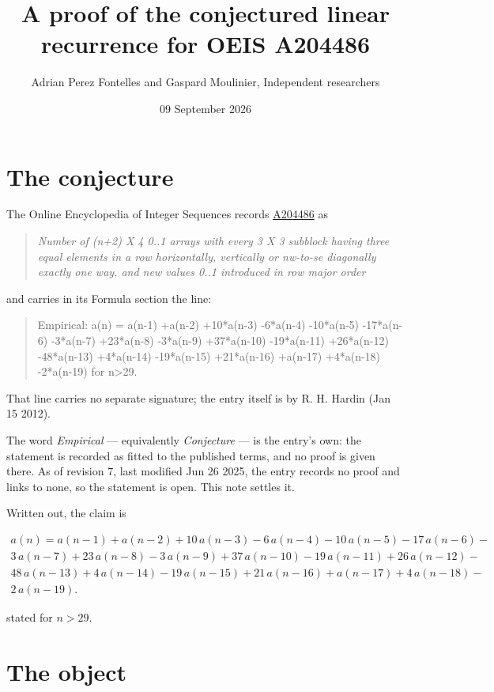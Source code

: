 \documentclass[11pt]{article}
\title{A proof of the conjectured linear recurrence for OEIS A204486}
\author{Adrian Perez Fontelles and Gaspard Moulinier, Independent researchers}
\date{09 September 2026}
\theoremstyle{definition}
\begin{document}
\maketitle
\section{The conjecture}

The Online Encyclopedia of Integer Sequences records \href{https://oeis.org/A204486}{A204486} as

\begin{quote}\itshape Number of (n+2) X 4 0..1 arrays with every 3 X 3 subblock having three equal elements in a row horizontally, vertically or nw-to-se diagonally exactly one way, and new values 0..1 introduced in row major order\end{quote}

and carries in its Formula section the line:

\begin{quote}\ttfamily Empirical: a(n) = a(n-1) +a(n-2) +10*a(n-3) -6*a(n-4) -10*a(n-5) -17*a(n-6) -3*a(n-7) +23*a(n-8) -3*a(n-9) +37*a(n-10) -19*a(n-11) +26*a(n-12) -48*a(n-13) +4*a(n-14) -19*a(n-15) +21*a(n-16) +a(n-17) +4*a(n-18) -2*a(n-19) for n>29.\end{quote}

That line carries no separate signature; the entry itself is by R. H. Hardin (Jan 15 2012).

The word {\itshape Empirical} --- equivalently {\itshape Conjecture} --- is the entry's own: the statement is recorded as fitted to the published terms, and no proof is given there. As of revision 7, last modified Jun 26 2025, the entry records no proof and links to none, so the statement is open. This note settles it.

Written out, the claim is

\begin{multline*} a(n) = a(n-1) + a(n-2) + 10\,a(n-3) - 6\,a(n-4) - 10\,a(n-5) - 17\,a(n-6) - \\ 3\,a(n-7) + 23\,a(n-8) - 3\,a(n-9) + 37\,a(n-10) - 19\,a(n-11) + 26\,a(n-12) - \\ 48\,a(n-13) + 4\,a(n-14) - 19\,a(n-15) + 21\,a(n-16) + a(n-17) + 4\,a(n-18) - \\ 2\,a(n-19). \end{multline*}

stated for $n > 29$.

\section{The object}
\end{document}
